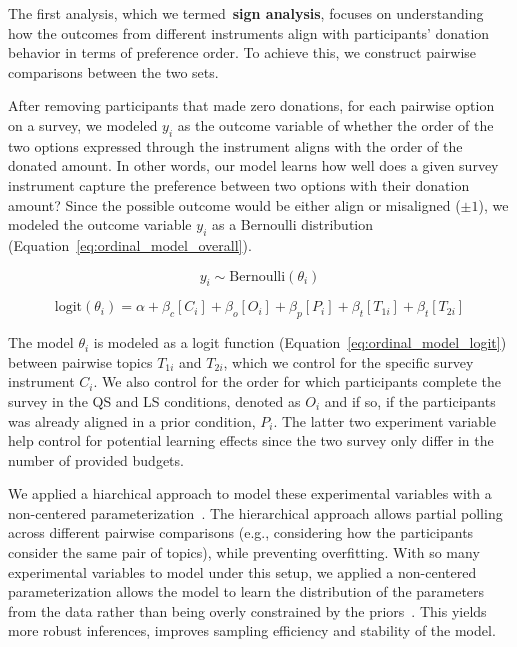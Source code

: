 The first analysis, which we termed~\textbf{sign analysis}, focuses on understanding how the outcomes from different instruments align with participants' donation behavior in terms of preference order. To achieve this, we construct pairwise comparisons between the two sets. 

After removing participants that made zero donations, for each pairwise option on a survey, we modeled $y_i$ as the outcome variable of whether the order of the two options expressed through the instrument aligns with the order of the donated amount. In other words, our model learns how well does a given survey instrument capture the preference between two options with their donation amount? Since the possible outcome would be either align or misaligned ($\pm 1$), we modeled the outcome variable $y_i$ as a Bernoulli distribution (Equation~\ref{eq:ordinal_model_overall}).

\begin{equation}
    \label{eq:ordinal_model_overall}
    y_i \sim \text{Bernoulli}(\theta_i)
\end{equation}

\begin{equation}
    \label{eq:ordinal_model_logit}
    \text{logit}(\theta_i) = \alpha + \beta_c[C_i] + \beta_o[O_i] + \beta_p[P_i] + \beta_t[T_{1i}] + \beta_t[T_{2i}]
\end{equation}

The model $\theta_i$ is modeled as a logit function (Equation~\ref{eq:ordinal_model_logit}) between pairwise topics $T_{1i}$ and $T_{2i}$, which we control for the specific survey instrument $C_i$. We also control for the order for which participants complete the survey in the QS and LS conditions, denoted as $O_i$ and if so, if the participants was already aligned in a prior condition, $P_i$. The latter two experiment variable help control for potential learning effects since the two survey only differ in the number of provided budgets.

We applied a hiarchical approach to model these experimental variables with a non-centered parameterization~\cite{mcelreath2018statistical}. The hierarchical approach allows partial polling across different pairwise comparisons (e.g., considering how the participants consider the same pair of topics), while preventing overfitting. With so many experimental variables to model under this setup, we applied a non-centered parameterization allows the model to learn the distribution of the parameters from the data rather than being overly constrained by the priors~\cite{mcelreath2018statistical}. This yields more robust inferences, improves sampling efficiency and stability of the model.

